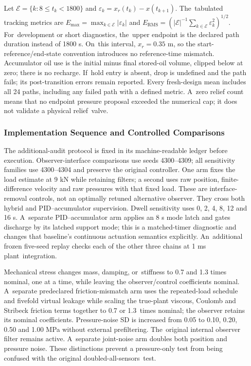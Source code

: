 \documentclass[machines,article,submit,pdftex,moreauthors]{Definitions/mdpi}
\begin{document}
Let $\mathcal E=\{k:8\le t_k<1800\}$ and $\varepsilon_k=x_r(t_k)-x(t_{k+1})$. The~tabulated tracking metrics are $E_{\max}=\max_{k\in\mathcal E}|\varepsilon_k|$ and $E_{\mathrm{RMS}}=(|\mathcal E|^{-1}\sum_{k\in\mathcal E}\varepsilon_k^2)^{1/2}$. For~development or short diagnostics, the~upper endpoint is the declared path duration instead of 1800 s. On~this interval, $x_r=0.35$ m, so the start-reference/end-state convention introduces no reference-time mismatch. Accumulator oil use is the initial minus final stored-oil volume, clipped below at zero; there is no recharge. If~hold entry is absent, drop is undefined and the path fails; its post-transition errors remain reported. Every fresh-design mean includes all 24 paths, including any failed path with a defined metric. A~zero relief count means that no endpoint pressure proposal exceeded the numerical cap; it does not validate a physical relief~valve.

\subsubsection{Implementation Sequence and Controlled Comparisons}

The additional-audit protocol is fixed in its machine-readable ledger before execution. Observer-interface comparisons use seeds 4300--4309; all sensitivity families use 4300--4304 and preserve the original controller. One arm fixes the load estimate at 9 kN while retaining filters; a second uses raw position, finite-difference velocity and raw pressures with that fixed load. These are interface-removal controls, not an optimally retuned alternative observer. They cross both hybrid and PID--accumulator supervision. Dwell sensitivity uses 0, 2, 4, 8, 12 and 16 s. A~separate PID--accumulator arm applies an 8 s mode latch and gates discharge by its latched support mode; this is a matched-timer diagnostic and changes that baseline's continuous actuation semantics explicitly. An~additional frozen five-seed replay checks each of the other three chains at 1 ms plant~integration.

Mechanical stress changes mass, damping, or~stiffness to 0.7 and 1.3 times nominal, one at a time, while leaving the observer/control coefficients nominal. A~separate predeclared friction-mismatch arm uses the repeated-load schedule and fivefold virtual leakage while scaling the true-plant viscous, Coulomb and Stribeck friction terms together to 0.7 or \mbox{1.3 times} nominal; the observer retains its nominal coefficients. Pressure-noise SD is increased from 0.05 to 0.10, 0.20, 0.50 and 1.00 MPa without external prefiltering. The~original internal observer filter remains active. A~separate joint-noise arm doubles both position and pressure noise. These distinctions prevent a pressure-only test from being confused with the original doubled-all-sensors~test.
\end{document}

